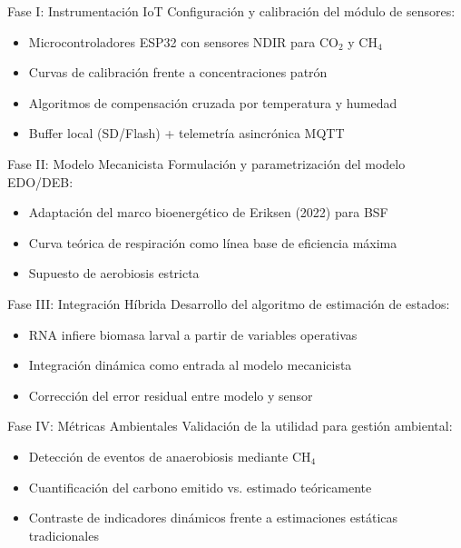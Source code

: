 \documentclass[aspectratio=169, 11pt]{beamer}
\begin{document}
\begin{frame}{Fase I: Instrumentación IoT}
    Configuración y calibración del módulo de sensores:
    \vspace{0.3cm}
    \begin{itemize}
        \item Microcontroladores ESP32 con sensores NDIR para CO$_2$ y CH$_4$
        \item Curvas de calibración frente a concentraciones patrón
        \item Algoritmos de compensación cruzada por temperatura y humedad
        \item Buffer local (SD/Flash) + telemetría asincrónica MQTT
    \end{itemize}
\end{frame}

\begin{frame}{Fase II: Modelo Mecanicista}
    Formulación y parametrización del modelo EDO/DEB:
    \vspace{0.3cm}
    \begin{itemize}
        \item Adaptación del marco bioenergético de Eriksen (2022) para BSF
        \item Curva teórica de respiración como línea base de eficiencia máxima
        \item Supuesto de aerobiosis estricta
    \end{itemize}
\end{frame}

\begin{frame}{Fase III: Integración Híbrida}
    Desarrollo del algoritmo de estimación de estados:
    \vspace{0.3cm}
    \begin{itemize}
        \item RNA infiere biomasa larval a partir de variables operativas
        \item Integración dinámica como entrada al modelo mecanicista
        \item Corrección del error residual entre modelo y sensor
    \end{itemize}
\end{frame}

\begin{frame}{Fase IV: Métricas Ambientales}
    Validación de la utilidad para gestión ambiental:
    \vspace{0.3cm}
    \begin{itemize}
        \item Detección de eventos de anaerobiosis mediante CH$_4$
        \item Cuantificación del carbono emitido vs. estimado teóricamente
        \item Contraste de indicadores dinámicos frente a estimaciones estáticas tradicionales
    \end{itemize}
\end{frame}
\end{document}
